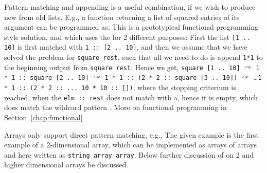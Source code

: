 \documentclass[fsharpnotes.tex]{subfiles}
\begin{document}
Pattern matching and appending is a useful combination, if we wish to produce new from old lists. E.g., a function returning a list of squared entries of its argument can be programmed as,
%
%
This is a prototypical functional programming style solution, and which uses the \lexeme{::} for 2 different purposes: First the list \lstinline![1 .. 10]! is first matched with \lstinline!1 :: [2 .. 10]!, and then we assume that we have solved the problem for \lstinline!square rest!, such that all we need to do is append \lstinline!1*1! to the beginning output from \lstinline!square rest!. Hence we get, \lstinline!square [1 .. 10]! $\curvearrowright$ \lstinline!1 * 1 :: square [2 .. 10]! $\curvearrowright$ \lstinline!1 * 1 :: (2 * 2 :: square [3 .. 10])! $\curvearrowright$ \dots \lstinline!1 * 1 :: (2 * 2 :: ... 10 * 10 :: [])!, where the stopping criterium is reached, when the \lstinline!elm :: rest! does not match with a, hence it is empty, which does match the wildcard pattern \lexeme{_}. More on functional programming in Section~\ref{chap:functional}


Arrays only support direct pattern matching, e.g.,
%
%
The given example is the first example of a 2-dimensional array, which can be implemented as arrays of arrays and here written as \lstinline!string array array!. Below further discussion of on 2 and higher dimensional arrays be discussed.  

\end{document}
